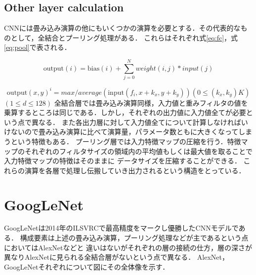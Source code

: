 {\subsection{Other layer calculation}
\label{sec:other_calc}
CNNには畳み込み演算の他にもいくつかの演算を必要とする．その代表的なものとして，全結合とプーリング処理がある．
これらはそれぞれ式\ref{eq:fc}，式\ref{eq:pool}で表される．

\begin{equation}
  \label{eq:fc}
  \mathrm{output}(i) = \mathrm{bias}(i) + \sum_{j=0}^{N} weight(i, j) * input(j)
\end{equation}

\begin{equation}
  \label{eq:pool}
	\mathrm{output}(x, y)^{i} = max / average(\mathrm{input}(f_i,x + k_x, y + k_y)) (0 \leq (k_x, k_y)  K)
\end{equation}
$(1 \leq d \leq 128)$
全結合層では畳み込み演算同様，入力値と重みフィルタの値を乗算するところは同じである．しかし，それぞれの出力値に入力値全てが必要という点で異なる．
また各出力層に対して入力値全てについて計算しなければいけないので畳み込み演算に比べて演算量，パラメータ数ともに大きくなってしまうという特徴もある．
プーリング層では入力特徴マップの圧縮を行う．特徴マップのそれぞれのフィルタサイズの領域内の平均値もしくは最大値を取ることで入力特徴マップの特徴はそのままに
データサイズを圧縮することができる．
これらの演算を各層で処理し伝搬していき出力されるという構造をとっている．

\section{GoogLeNet}
\label{sec:googlenet}
GoogLeNetは2014年のILSVRCで最高精度をマークし優勝したCNNモデルである．
構成要素は上述の畳み込み演算，プーリング処理などが主であるという点においてはAlexNetなどと
違いはないがそれぞれの層の接続の仕方，層の深さが異なりAlexNetに見られる全結合層がないという点で異なる．
AlexNet， GoogLeNetそれぞれについて図にその全体像を示す．


}
